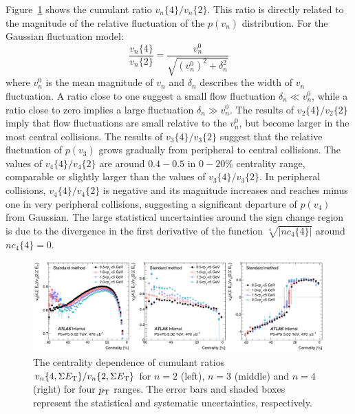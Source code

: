 Figure~\ref{fig:centfluc_ATLAS_vn_4pc_ratio} shows the cumulant ratio $v_n\{4\} / v_n\{2\}$. This ratio is directly related to the magnitude of the relative fluctuation of the $p(v_n)$ distribution. For the Gaussian fluctuation model:
\begin{equation}
\frac{v_n\{4\}}{v_n\{2\}} = \frac{v_n^0}{\sqrt{(v_n^0)^2 + \delta_n^2}}
\end{equation}
where $v_n^0$ is the mean magnitude of $v_n$ and $\delta_n$ describes the width of $v_n$ fluctuation. A ratio close to one suggest a small flow fluctuation $\delta_n \ll v_n^0$, while a ratio close to zero implies a large fluctuation $\delta_n \gg v_n^0$. The results of $v_2\{4\}/v_2\{2\}$ imply that flow fluctuations are small relative to the $v_n^0$, but become larger in the most central collisions. The results of $v_3\{4\} / v_3\{2\}$ suggest that the relative fluctuation of $p(v_3)$ grows gradually from peripheral to central collisions. The values of $v_4\{4\} / v_4\{2\}$ are around $0.4-0.5$ in $0-20\%$ centrality range, comparable or slightly larger than the values of $v_3\{4\} / v_3\{2\}$. In peripheral collisions, $v_4\{4\} / v_4\{2\}$ is negative and its magnitude increases and reaches minus one in very peripheral collisions, suggesting a significant departure of $p(v_4)$ from Gaussian. The large statistical uncertainties around the sign change region is due to the divergence in the first derivative of the function $\sqrt[4]{|nc_4\{4\}|}$ around $nc_4\{4\}=0$.

\begin{figure}[H]
\centering
\includegraphics[width=.95\linewidth]{figs/chapter_centfluc/ATLAS_vn_4pc_ratio.png}
\caption{The centrality dependence of cumulant ratios $v_n\{4, \Sigma E_\text{T}\} / v_n\{2, \Sigma E_\text{T}\}$ for $n=2$ (left), $n=3$ (middle) and $n=4$ (right) for four $p_\text{T}$ ranges. The error bars and shaded boxes represent the statistical and systematic uncertainties, respectively.}
\label{fig:centfluc_ATLAS_vn_4pc_ratio}
\end{figure}

